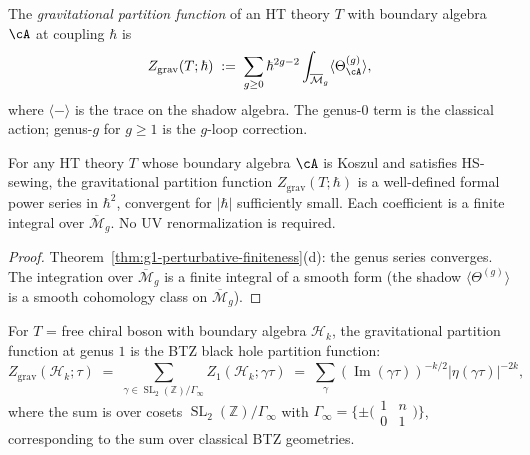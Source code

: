 \begin{definition}%
\label{def:g1-grav-partition}%
%
The \emph{gravitational partition function} of an HT
theory $T$ with boundary algebra $\cA$ at coupling $\hbar$
is
\begin{equation}\label{eq:g1-grav-partition}
Z_{\mathrm{grav}}(T;\hbar)
\;:=\;
\sum_{g \geq 0} \hbar^{2g-2}
\int_{\overline{\mathcal{M}}_g}
\langle \Theta_\cA^{(g)} \rangle,
\end{equation}
where $\langle - \rangle$ is the trace on the shadow
algebra.  The genus-$0$ term is the classical action;
genus-$g$ for $g \geq 1$ is the $g$-loop correction.
\end{definition}

\begin{theorem}%
\label{thm:g1-grav-finiteness}%
%
For any HT theory $T$ whose boundary algebra $\cA$ is
Koszul and satisfies HS-sewing, the gravitational partition
function $Z_{\mathrm{grav}}(T;\hbar)$ is a well-defined
formal power series in $\hbar^2$, convergent for $|\hbar|$
sufficiently small.  Each coefficient is a finite integral
over $\overline{\mathcal{M}}_g$.  No UV renormalization is
required.
\end{theorem}

\begin{proof}
Theorem~\ref{thm:g1-perturbative-finiteness}(d):
the genus series converges.  The integration over
$\overline{\mathcal{M}}_g$ is a finite integral of a
smooth form (the shadow $\langle \Theta^{(g)} \rangle$ is
a smooth cohomology class on $\overline{\mathcal{M}}_g$).
\end{proof}

\begin{proposition}%
\label{prop:g1-btz}%
%
%
For $T$ = free chiral boson with boundary algebra
$\mathcal{H}_k$, the gravitational partition function
at genus $1$ is the BTZ black hole partition function:
\begin{equation}\label{eq:g1-btz}
Z_{\mathrm{grav}}(\mathcal{H}_k;\tau)
\;=\;
\sum_{\gamma \in
\operatorname{SL}_2(\mathbb{Z})/\Gamma_\infty}
Z_1(\mathcal{H}_k;\gamma\tau)
\;=\;
\sum_{\gamma}
(\operatorname{Im}(\gamma\tau))^{-k/2}
|\eta(\gamma\tau)|^{-2k},
\end{equation}
where the sum is over cosets
$\operatorname{SL}_2(\mathbb{Z})/\Gamma_\infty$ with
$\Gamma_\infty = \{\pm \bigl(\begin{smallmatrix}
1 & n \\ 0 & 1 \end{smallmatrix}\bigr)\}$, corresponding to
the sum over classical BTZ geometries.
\end{proposition}


